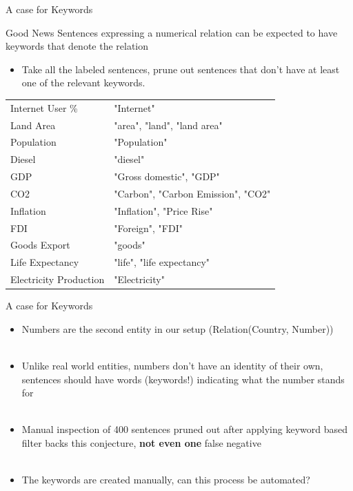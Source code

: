\documentclass{beamer}
\begin{document}
\begin{frame}{A case for Keywords}
 \begin{exampleblock}{Good News}
  Sentences expressing a numerical relation can be expected to have keywords that denote the relation
 \end{exampleblock}

 \begin{itemize}
  \item Take all the labeled sentences, prune out sentences that don't have at least one of the relevant keywords.
 \end{itemize}
 \begin{table}
  \tiny

 \begin{tabular}{|l|l|}
  \hline
  Internet User \% & "Internet" \\
Land Area & "area", "land", "land area" \\
Population &"Population" \\
Diesel & "diesel" \\
GDP &"Gross domestic", "GDP" \\
CO2 &"Carbon", "Carbon Emission", "CO2" \\
Inflation & "Inflation", "Price Rise" \\
FDI & "Foreign", "FDI" \\
Goods Export & "goods" \\
Life Expectancy & "life", "life expectancy" \\
Electricity Production & "Electricity" \\
 \hline
 \end{tabular}
 \end{table}
\end{frame}
\begin{frame}{A case for Keywords}
\begin{itemize} 
  \item Numbers are the second entity in our setup (Relation(Country, Number)) \\~\\
  \item Unlike real world entities, numbers don't have an identity of their own, sentences should have words (keywords!) indicating what the number stands for \\~\\
  \item Manual inspection of 400 sentences pruned out after applying keyword based filter backs this conjecture, \textbf{not even one} false negative \\~\\
  \item The keywords are created manually, can this process be automated?
\end{itemize}
\end{frame}
\end{document}
